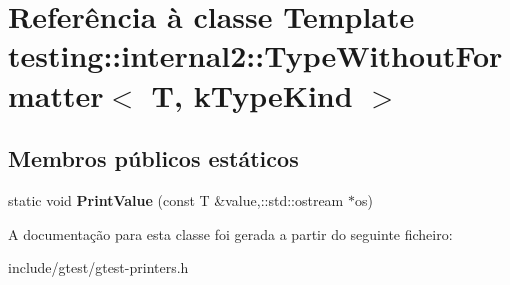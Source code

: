 \hypertarget{classtesting_1_1internal2_1_1TypeWithoutFormatter}{\section{Referência à classe Template testing\-:\-:internal2\-:\-:Type\-Without\-Formatter$<$ T, k\-Type\-Kind $>$}
\label{classtesting_1_1internal2_1_1TypeWithoutFormatter}
}
\subsection*{Membros públicos estáticos}
\begin{DoxyCompactItemize}
\item 
\hypertarget{classtesting_1_1internal2_1_1TypeWithoutFormatter_a6c377c9580fce3a0226911417053f417}{static void {\bfseries Print\-Value} (const T \&value,\-::std\-::ostream $\ast$os)}\label{classtesting_1_1internal2_1_1TypeWithoutFormatter_a6c377c9580fce3a0226911417053f417}

\end{DoxyCompactItemize}


A documentação para esta classe foi gerada a partir do seguinte ficheiro\-:\begin{DoxyCompactItemize}
\item 
include/gtest/gtest-\/printers.\-h\end{DoxyCompactItemize}
